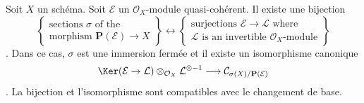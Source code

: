 \begin{lemma}
\label{lemma-conormal-sheaf-section-projective-bundle}
Soit  $X$  un schéma. Soit  $\mathcal{E}$  un  $\mathcal{O}_X$-module
quasi-cohérent. Il existe une bijection
$$
\left\{
\begin{matrix}
\text{sections }\sigma\text{ of the } \\
\text{morphism } \mathbf{P}(\mathcal{E}) \to X
\end{matrix}
\right\}
\leftrightarrow
\left\{
\begin{matrix}
\text{surjections }\mathcal{E} \to \mathcal{L}\text{ where} \\
\mathcal{L}\text{ is an invertible }\mathcal{O}_X\text{-module}
\end{matrix}
\right\}
$$
. Dans ce cas,  $\sigma$  est une immersion fermée et il existe un isomorphisme
canonique
$$
\Ker(\mathcal{E} \to \mathcal{L})
\otimes_{\mathcal{O}_X} \mathcal{L}^{\otimes -1}
\longrightarrow
\mathcal{C}_{\sigma(X)/\mathbf{P}(\mathcal{E})}
$$
. La bijection et l'isomorphisme sont compatibles avec le changement de base.
\end{lemma}

